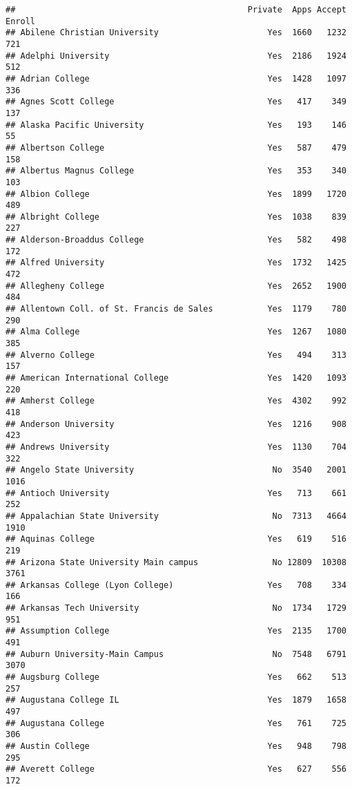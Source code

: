 \documentclass[
]{article}
\begin{document}
\begin{verbatim}
##                                               Private  Apps Accept Enroll
## Abilene Christian University                      Yes  1660   1232    721
## Adelphi University                                Yes  2186   1924    512
## Adrian College                                    Yes  1428   1097    336
## Agnes Scott College                               Yes   417    349    137
## Alaska Pacific University                         Yes   193    146     55
## Albertson College                                 Yes   587    479    158
## Albertus Magnus College                           Yes   353    340    103
## Albion College                                    Yes  1899   1720    489
## Albright College                                  Yes  1038    839    227
## Alderson-Broaddus College                         Yes   582    498    172
## Alfred University                                 Yes  1732   1425    472
## Allegheny College                                 Yes  2652   1900    484
## Allentown Coll. of St. Francis de Sales           Yes  1179    780    290
## Alma College                                      Yes  1267   1080    385
## Alverno College                                   Yes   494    313    157
## American International College                    Yes  1420   1093    220
## Amherst College                                   Yes  4302    992    418
## Anderson University                               Yes  1216    908    423
## Andrews University                                Yes  1130    704    322
## Angelo State University                            No  3540   2001   1016
## Antioch University                                Yes   713    661    252
## Appalachian State University                       No  7313   4664   1910
## Aquinas College                                   Yes   619    516    219
## Arizona State University Main campus               No 12809  10308   3761
## Arkansas College (Lyon College)                   Yes   708    334    166
## Arkansas Tech University                           No  1734   1729    951
## Assumption College                                Yes  2135   1700    491
## Auburn University-Main Campus                      No  7548   6791   3070
## Augsburg College                                  Yes   662    513    257
## Augustana College IL                              Yes  1879   1658    497
## Augustana College                                 Yes   761    725    306
## Austin College                                    Yes   948    798    295
## Averett College                                   Yes   627    556    172

\end{verbatim}
\end{document}
